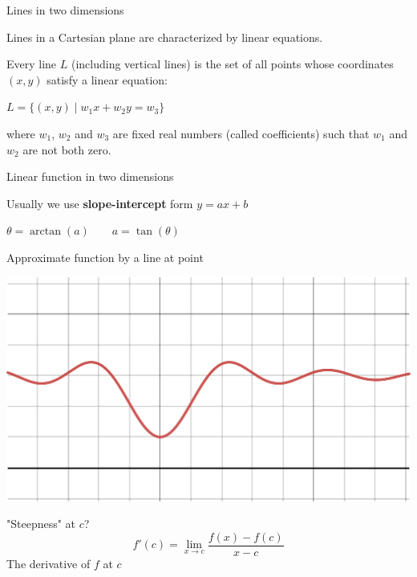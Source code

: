 \documentclass[12pt,aspectratio=169,handout]{beamer}
\begin{document}
\begin{frame}{Lines in two dimensions}
	
	Lines in a Cartesian plane are characterized by linear equations.
	
	Every line $L$ (including vertical lines) is the set of all points whose coordinates $(x, y)$ satisfy a linear equation:
	
	$L=\{(x,y)\mid w_1 x+ w_2 y= w_3\}$
	
	where $w_1$, $w_2$ and $w_3$ are fixed real numbers (called coefficients) such that $w_1$ and $w_2$ are not both zero.
	
\end{frame}


\begin{frame}{Linear function in two dimensions}
	
	Usually we use \textbf{slope-intercept} form $y= a x + b$
	
	
	
	$\theta = \arctan (a) \qquad a = \tan (\theta)$
	
\end{frame}



\begin{frame}{Approximate function by a line at point}
	
	
	\includegraphics[width=0.7\linewidth]{img/desmos-graph1.pdf}
	
	
	
	
	"Steepness" at $c$?
	$$f'(c) = \lim_{x \to c} \frac{f(x) - f(c)}{x - c}$$
	The derivative of $f$ at $c$
	
	
	
	
	
\end{frame}
\end{document}
